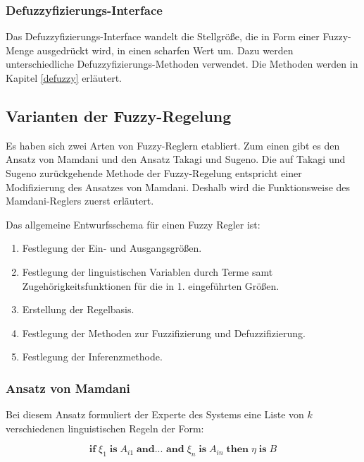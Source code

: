 \documentclass[12pt,a4paper,bibliography=totocnumbered,listof=totocnumbered]{article}
\theoremstyle{Umgebung}
\begin{document}
\subsubsection{Defuzzyfizierungs-Interface}

Das Defuzzyfizierungs-Interface wandelt die Stellgröße, die in Form einer Fuzzy-Menge ausgedrückt wird, in einen scharfen Wert um. Dazu werden unterschiedliche Defuzzyfizierungs-Methoden verwendet. Die Methoden werden in Kapitel \ref{defuzzy} erläutert.


\subsection{Varianten der Fuzzy-Regelung}

Es haben sich zwei Arten von Fuzzy-Reglern etabliert. Zum einen gibt es den Ansatz von Mamdani und den Ansatz Takagi und Sugeno. Die auf Takagi und Sugeno zurückgehende Methode der Fuzzy-Regelung entspricht einer Modifizierung des Ansatzes von Mamdani.
Deshalb wird die Funktionsweise des Mamdani-Reglers zuerst erläutert.

Das allgemeine Entwurfsschema für einen Fuzzy Regler ist:

\begin{enumerate} 
	\item Festlegung der Ein- und Ausgangsgrößen.
	\item Festlegung der linguistischen Variablen durch Terme samt Zugehörigkeitsfunktionen
	für die in 1. eingeführten Größen.
	\item Erstellung der Regelbasis.
	\item Festlegung der Methoden zur Fuzzifizierung und Defuzzifizierung.
	\item Festlegung der Inferenzmethode.
\end{enumerate}

\subsubsection{Ansatz von Mamdani}

Bei diesem Ansatz formuliert der Experte des Systems eine Liste von $k$ verschiedenen linguistischen Regeln  der Form:

\begin{equation}
	\textbf{if} \; \xi_1 \; \textbf{is} \; A_{i1} \; \textbf{and... and} \; \xi_n \; \textbf{is} \; A_{in} \; \textbf{then} \; \eta \;\textbf{is} \;B
\end{equation}
\end{document}
